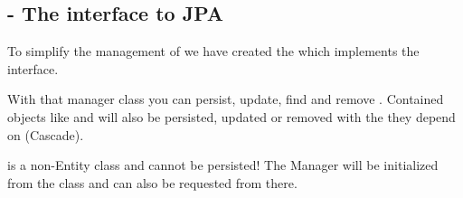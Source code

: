 \subsection{ - The interface to JPA}
To simplify the management of  we have created the  which implements the  interface. 

With that manager class you can persist, update, find and remove . Contained objects like  and  will also be persisted, updated or removed with the they depend on (Cascade).

 is a non-Entity class and cannot be persisted! The Manager will be initialized from the  class and can also be requested from there.

